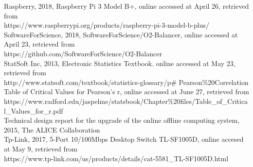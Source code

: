 Raspberry, 2018, Raspberry Pi 3 Model B+, online accessed at April 26, retrieved from \\https://www.raspberrypi.org/products/raspberry-pi-3-model-b-plus/\\

SoftwareForScience, 2018, SoftwareForScience/O2-Balancer, online accessed at April 23, retrieved from \\https://github.com/SoftwareForScience/O2-Balancer\\

StatSoft Inc, 2013, Electronic Statistics Textbook. online accessed at May 23, retrieved from  \\http://www.statsoft.com/textbook/statistics-glossary/p\# Pearson\%20Correlation\\

Table of Critical Values for Pearson's r, online accessed at June 27, retrieved from \\https://www.radford.edu/jaspelme/statsbook/Chapter\%20files/Table\_of\_Critical\_Values\_for\_r.pdf\\

Technical design report for the upgrade of the online offline computing system, 2015, The ALICE Collaboration\\

Tp-Link, 2017, 5-Port 10/100Mbps Desktop Switch TL-SF1005D, online accesed at May 9, retrieved from \\https://www.tp-link.com/us/products/details/cat-5581\_TL-SF1005D.html\\